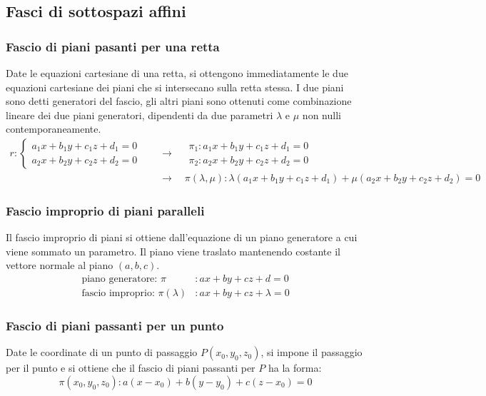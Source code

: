 \documentclass[a4paper]{article}
\begin{document}
\subsection{Fasci di sottospazi affini}
\subsubsection*{Fascio di piani pasanti per una retta}
Date le equazioni cartesiane di una retta, si ottengono immediatamente le due equazioni cartesiane dei piani che si intersecano
sulla retta stessa. I due piani sono detti generatori del fascio, gli altri piani sono ottenuti come combinazione lineare dei
due piani generatori, dipendenti da due parametri \(\lambda\) e \(\mu\) non nulli contemporaneamente.
\begin{align*}
	r: \begin{cases}
		a_1 x + b_1 y + c_1 z + d_1 = 0 \\
		a_2 x + b_2 y + c_2 z + d_2 = 0
	\end{cases}
	\quad &\longrightarrow \quad \begin{aligned}
		\pi_1 : a_1 x + b_1 y + c_1 z + d_1 = 0 \\
		\pi_2 : a_2 x + b_2 y + c_2 z + d_2 = 0
	\end{aligned}
	\\ \quad &\longrightarrow \quad
	\pi(\lambda,\mu): \lambda (a_1 x + b_1 y + c_1 z + d_1) + \mu (a_2 x + b_2 y + c_2 z + d_2) = 0
\end{align*}

\subsubsection*{Fascio improprio di piani paralleli}
Il fascio improprio di piani si ottiene dall'equazione di un piano generatore a cui viene sommato un parametro. Il piano viene
traslato mantenendo costante il vettore normale al piano \((a,b,c)\).
\begin{align*}
	\text{piano generatore: } \pi &: ax + by + cz + d = 0 \\
	\text{fascio improprio: } \pi(\lambda) &: ax + by + cz + \lambda = 0
\end{align*}

\subsubsection*{Fascio di piani passanti per un punto}
Date le coordinate di un punto di passaggio \(P (x_0, y_0, z_0)\), si impone il passaggio per il punto e si ottiene che il fascio
di piani passanti per \(P\) ha la forma:
\[\pi(x_0,y_0,z_0): a(x-x_0) + b(y-y_0) + c(z-x_0) = 0\]
\end{document}

